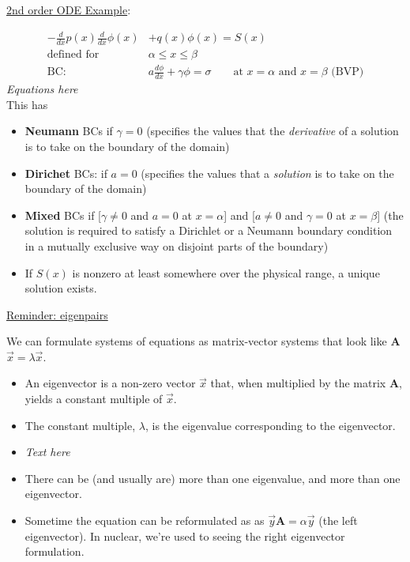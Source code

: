 \documentclass[12pt]{exam}
\newcommand{\ve}[1]{\ensuremath{\mathbf{#1}}}
\begin{document}
\vspace*{1em}
\underline{2nd order ODE Example}:

\ifprintanswers
\begin{align}
-\frac{d}{dx}p(x) \frac{d}{dx}\phi(x) &+ q(x)\phi(x) = S(x) \nonumber \\
\text{defined for }& \alpha \le x \le \beta \nonumber \\
\text{BC: }& a\frac{d\phi}{dx} + \gamma \phi = \sigma \qquad \text{at } x=\alpha \text{ and } x = \beta \text{ (BVP)}\nonumber
\end{align}
\else
 \hspace*{8em}\textit{Equations here}\\
\fi
%
This has
\begin{itemize}
\item \textbf{Neumann} BCs if $\gamma = 0$ (specifies the values that the \textit{derivative} of a solution is to take on the boundary of the domain)
\item \textbf{Dirichet} BCs: if $a=0$ (specifies the values that a \textit{solution} is to take on the boundary of the domain)
\item \textbf{Mixed} BCs if [$\gamma \ne 0$ and $a = 0$ at $x = \alpha$] and [$a \ne 0$ and $\gamma = 0$ at $x = \beta$] (the solution is required to satisfy a Dirichlet or a Neumann boundary condition in a mutually exclusive way on disjoint parts of the boundary)
\item If $S(x)$ is nonzero at least somewhere over the physical range, a unique solution exists.
\end{itemize}

\vspace*{1 em} \underline{Reminder: eigenpairs}

We can formulate systems of equations as matrix-vector systems that look like \ve{A}$\vec{x} = \lambda \vec{x}$. 
\begin{itemize}
\item An eigenvector is a non-zero vector $\vec{x}$ that, when multiplied by the matrix \ve{A}, yields a constant multiple of $\vec{x}$. 
\ifprintanswers
\item The constant multiple, $\lambda$, is the eigenvalue corresponding to the eigenvector.
\else
 \item \textit{Text here}
\fi
\item There can be (and usually are) more than one eigenvalue, and more than one eigenvector. 
\item Sometime the equation can be reformulated as as $\vec{y}\ve{A} = \alpha \vec{y}$ (the left eigenvector). In nuclear, we're used to seeing the right eigenvector formulation.
\end{itemize}
\end{document}
